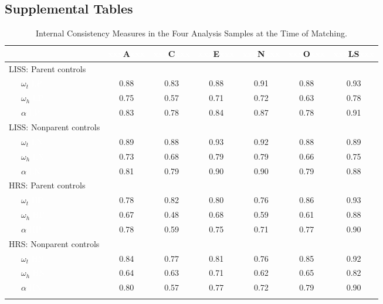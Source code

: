 \documentclass[
  english,
  man,floatsintext]{apa7}
\begin{document}
\newpage

\hypertarget{supplemental-tables}{%
\subsection{Supplemental Tables}\label{supplemental-tables}}





\begin{table}[h]

\begin{center}
\begin{threeparttable}

\caption{\label{tab:int-consist}Internal Consistency Measures in the Four Analysis Samples at the Time of Matching.}

\begin{tabular}{lcccccc}
\toprule
 & \multicolumn{1}{c}{\textcolor{white}{xxx}A\textcolor{white}{xxx}} & \multicolumn{1}{c}{\textcolor{white}{xxx}C\textcolor{white}{xxx}} & \multicolumn{1}{c}{\textcolor{white}{xxx}E\textcolor{white}{xxx}} & \multicolumn{1}{c}{\textcolor{white}{xxx}N\textcolor{white}{xxx}} & \multicolumn{1}{c}{\textcolor{white}{xxx}O\textcolor{white}{xxx}} & \multicolumn{1}{c}{\textcolor{white}{xxx}LS\textcolor{white}{xxx}}\\
\midrule
LISS: Parent controls &  &  &  &  &  & \\
\ \ \ ${\omega}_{t}$ \textcolor{white}{LP} & 0.88 & 0.83 & 0.88 & 0.91 & 0.88 & 0.93\\
\ \ \ ${\omega}_{h}$ \textcolor{white}{LP} & 0.75 & 0.57 & 0.71 & 0.72 & 0.63 & 0.78\\
\ \ \ ${\alpha}$ \textcolor{white}{LP} & 0.83 & 0.78 & 0.84 & 0.87 & 0.78 & 0.91\\
LISS: Nonparent controls &  &  &  &  &  & \\
\ \ \ ${\omega}_{t}$ \textcolor{white}{LN} & 0.89 & 0.88 & 0.93 & 0.92 & 0.88 & 0.89\\
\ \ \ ${\omega}_{h}$ \textcolor{white}{LN} & 0.73 & 0.68 & 0.79 & 0.79 & 0.66 & 0.75\\
\ \ \ ${\alpha}$ \textcolor{white}{LN} & 0.81 & 0.79 & 0.90 & 0.90 & 0.79 & 0.88\\
HRS: Parent controls &  &  &  &  &  & \\
\ \ \ ${\omega}_{t}$ \textcolor{white}{HP} & 0.78 & 0.82 & 0.80 & 0.76 & 0.86 & 0.93\\
\ \ \ ${\omega}_{h}$ \textcolor{white}{HP} & 0.67 & 0.48 & 0.68 & 0.59 & 0.61 & 0.88\\
\ \ \ ${\alpha}$ \textcolor{white}{HP} & 0.78 & 0.59 & 0.75 & 0.71 & 0.77 & 0.90\\
HRS: Nonparent controls &  &  &  &  &  & \\
\ \ \ ${\omega}_{t}$ \textcolor{white}{HN} & 0.84 & 0.77 & 0.81 & 0.76 & 0.85 & 0.92\\
\ \ \ ${\omega}_{h}$ \textcolor{white}{HN} & 0.64 & 0.63 & 0.71 & 0.62 & 0.65 & 0.82\\
\ \ \ ${\alpha}$ \textcolor{white}{HN} & 0.80 & 0.57 & 0.77 & 0.72 & 0.79 & 0.90\\
\bottomrule
\addlinespace
\end{tabular}


\end{threeparttable}
\end{center}
\end{table}
\end{document}
